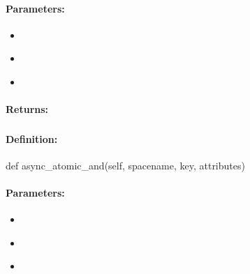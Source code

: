 \paragraph{Parameters:}
\begin{itemize}[noitemsep]
\item {}\\

\item {}\\

\item {}\\

\end{itemize}

\paragraph{Returns:}


\pagebreak
\subsubsection{}
\label{api:python:async_atomic_and}


\paragraph{Definition:}
\begin{pythoncode}
def async_atomic_and(self, spacename, key, attributes)
\end{pythoncode}

\paragraph{Parameters:}
\begin{itemize}[noitemsep]
\item {}\\

\item {}\\

\item {}\\

\end{itemize}

